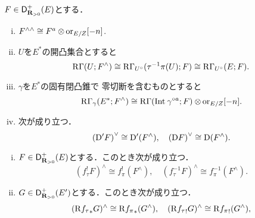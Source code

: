 \begin{PRP}[{\cite[Proposition 3.7.12]{KS90}}]
    \(F\in\mathop{\mathsf{D}^{+}_{\mathbf{R}_{>0}}}\nolimits(E)\)とする．
    \begin{enumerate}[(i)]
        \item \(F^{\wedge\wedge}\cong F^a\tens \ori_{E/Z}[-n]\).
        \item \(U\)を\(E^\ast\)の開凸集合とすると\[
            \mathop{\mathrm{R}\hspace{-0pt}\Gamma}\nolimits(U;F^\wedge)
            \cong\mathop{\mathrm{R}\hspace{-0pt}\Gamma}\nolimits_{U^\circ}(\tau^{-1}\pi(U);F)
            \cong\mathop{\mathrm{R}\hspace{-0pt}\Gamma}\nolimits_{U^\circ}(E;F).
        \]
        \item \(\gamma\)を\(E^\ast\)の固有閉凸錐で
        零切断を含むものとすると\[
            \RG_{\gamma}(E^\ast;F^\wedge)
            \cong
            \RG(\Int{\gamma^{\circ a}};F)\tens\ori_{E/Z}[-n].
        \]
        \item 次が成り立つ．\[
            \left(\mathrm{D}'F\right)^\vee\cong\mathrm{D}'(F^\wedge),
            \quad
            \left(\mathrm{D} F\right)^\vee\cong\mathrm{D}(F^\wedge).
            \]
    \end{enumerate}
\end{PRP}
\begin{PRP}[{\cite[Proposition 3.7.13]{KS90}}]
    \begin{enumerate}[(i)]
        \item \(F\in\mathop{\mathsf{D}^{+}_{\mathbf{R}_{>0}}}\nolimits(E)\)とする．このとき次が成り立つ．\[
            (f_\tau^!F)^\wedge\cong f_\pi^!(F^\wedge),
            \quad
            (f_\tau^{-1}F)^\wedge\cong f_\pi^{-1}(F^\wedge).
            \]
        \item \(G\in\mathop{\mathsf{D}^{+}_{\mathbf{R}_{>0}}}\nolimits(E')\)とする．このとき次が成り立つ．\[
            (\mathrm{R}{f_\tau}_\ast G)^\wedge\cong \mathrm{R}{f_\pi}_\ast(G^\wedge),
            \quad
            (\mathrm{R}{f_\tau}_! G)^\wedge\cong \mathrm{R}{f_\pi}_!(G^\wedge),
            \]
    \end{enumerate}
\end{PRP}
